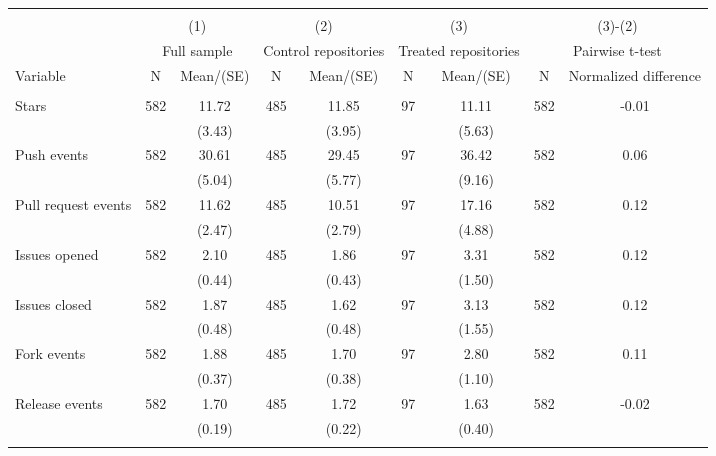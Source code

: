 \begin{tabular}{@{\extracolsep{5pt}}lcccccccc}
\\[-1.8ex]\hline \hline \\[-1.8ex]
 & \multicolumn{2}{c}{(1)}  & \multicolumn{2}{c}{(2)}  & \multicolumn{2}{c}{(3)}  & \multicolumn{2}{c}{(3)-(2)} \\
 & \multicolumn{2}{c}{Full sample}  & \multicolumn{2}{c}{Control repositories}  & \multicolumn{2}{c}{Treated repositories}  & \multicolumn{2}{c}{Pairwise t-test}  \\
Variable & N & Mean/(SE) & N & Mean/(SE) & N & Mean/(SE) & N & Normalized difference \\ \hline \\[-1.8ex] 
Stars   & 582    & 11.72    & 485    & 11.85    & 97    & 11.11    & 582    & -0.01   \\
 &   & (3.43)  &   & (3.95)  &   & (5.63)  &   &  \\ [1ex]
Push events   & 582    & 30.61    & 485    & 29.45    & 97    & 36.42    & 582    & 0.06   \\
 &   & (5.04)  &   & (5.77)  &   & (9.16)  &   &  \\ [1ex]
Pull request events   & 582    & 11.62    & 485    & 10.51    & 97    & 17.16    & 582    & 0.12   \\
 &   & (2.47)  &   & (2.79)  &   & (4.88)  &   &  \\ [1ex]
Issues opened   & 582    & 2.10    & 485    & 1.86    & 97    & 3.31    & 582    & 0.12   \\
 &   & (0.44)  &   & (0.43)  &   & (1.50)  &   &  \\ [1ex]
Issues closed   & 582    & 1.87    & 485    & 1.62    & 97    & 3.13    & 582    & 0.12   \\
 &   & (0.48)  &   & (0.48)  &   & (1.55)  &   &  \\ [1ex]
Fork events   & 582    & 1.88    & 485    & 1.70    & 97    & 2.80    & 582    & 0.11   \\
 &   & (0.37)  &   & (0.38)  &   & (1.10)  &   &  \\ [1ex]
Release events   & 582    & 1.70    & 485    & 1.72    & 97    & 1.63    & 582    & -0.02   \\
 &   & (0.19)  &   & (0.22)  &   & (0.40)  &   &  \\ [1ex]
\hline \hline \\[-1.8ex]

\end{tabular}
